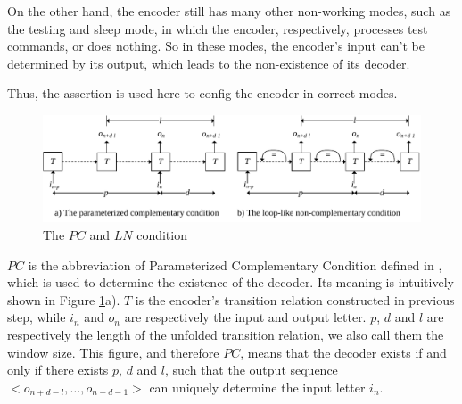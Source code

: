 \documentclass[runningheads,a4paper]{llncs}
\begin{document}
On the other hand,
the encoder still has many other non-working modes,
such as the testing and sleep mode,
in which the encoder,
respectively,
processes test commands,
or does nothing.
So in these modes,
the encoder's input can't be determined by its output,
which leads to the non-existence of its decoder.

Thus,
the assertion is used here to config the encoder in correct modes.

%

\vspace{0.2cm}
\vspace{0.2cm}

\begin{figure}[t]
\begin{center}
\includegraphics[width=\textwidth]{pcln}
\end{center}
\caption{The $PC$ and $LN$ condition}
  \label{fig_pcln}
\end{figure}

$PC$ is the abbreviation of Parameterized Complementary Condition defined in \cite{ShengYuShen:iccad09},
which is used to determine the existence of the decoder.
Its meaning is intuitively shown in Figure \ref{fig_pcln}a).
$T$ is the encoder's transition relation constructed in previous step,
while $i_n$ and $o_n$ are respectively the input and output letter.
$p$, $d$ and $l$ are respectively the length of the unfolded transition relation,
we also call them the window size.
This figure,
and therefore $PC$,
means that the decoder exists if and only if there exists $p$, $d$ and $l$,
such that the output sequence $<o_{n+d-l},\dots,o_{n+d-1}>$ can uniquely determine the input letter $i_n$.
\end{document}
